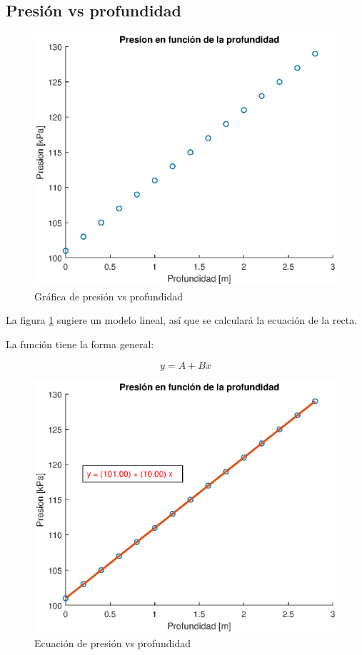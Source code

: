 \documentclass[letter,11pt]{article}
\begin{document}
\subsection{Presión vs profundidad}
\begin{figure}[!h]
\centering
\includegraphics[scale=1.00]{eps/3.2.1.eps}
\caption{Gráfica de presión vs profundidad}
\label{practica32}
\end{figure}

La figura \ref{practica32} sugiere un modelo lineal, así que se calculará la
ecuación de la recta.

La función tiene la forma general:

\begin{equation}
    y = A + B x
\end{equation}

\begin{figure}[!h]
\centering
\includegraphics[scale=1.00]{eps/3.2.2.eps}
\caption{Ecuación de presión vs profundidad}
\label{practica32_2}
\end{figure}
\end{document}
